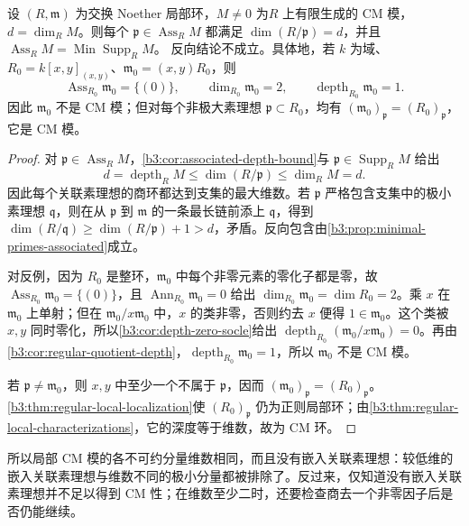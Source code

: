 \begin{proposition}\label{b3:prop:cm-associated-dimensions}
	设 \((R,\mathfrak m)\) 为交换 Noether 局部环，\(M\ne0\) 为\(R\) 上有限生成的 CM 模，\(d=\dim_RM\)。则每个 \(\mathfrak p\in\operatorname{Ass}_RM\) 都满足 \(\dim(R/\mathfrak p)=d\)，并且 \(\operatorname{Ass}_RM=\operatorname{Min}\operatorname{Supp}_RM\)。 反向结论不成立。具体地，若 \(k\) 为域、\(R_0=k[x,y]_{(x,y)}\)、\(\mathfrak m_0=(x,y)R_0\)，则
	\[
		\operatorname{Ass}_{R_0}\mathfrak m_0=\{(0)\},\qquad \dim_{R_0}\mathfrak m_0=2,\qquad \operatorname{depth}_{R_0}\mathfrak m_0=1.
	\]
	因此 \(\mathfrak m_0\) 不是 CM 模；但对每个非极大素理想 \(\mathfrak p\subset R_0\)，均有 \((\mathfrak m_0)_{\mathfrak p}=(R_0)_{\mathfrak p}\)，它是 CM 模。
\end{proposition}
\begin{proof}
	对 \(\mathfrak p\in\operatorname{Ass}_RM\)，\cref{b3:cor:associated-depth-bound}与 \(\mathfrak p\in\operatorname{Supp}_RM\) 给出
	\[
		d=\operatorname{depth}_RM\le\dim(R/\mathfrak p)\le\dim_RM=d.
	\]
	因此每个关联素理想的商环都达到支集的最大维数。若 \(\mathfrak p\) 严格包含支集中的极小素理想 \(\mathfrak q\)，则在从 \(\mathfrak p\) 到 \(\mathfrak m\) 的一条最长链前添上 \(\mathfrak q\)，得到 \(\dim(R/\mathfrak q)\ge\dim(R/\mathfrak p)+1>d\)，矛盾。反向包含由\cref{b3:prop:minimal-primes-associated}成立。

	对反例，因为 \(R_0\) 是整环，\(\mathfrak m_0\) 中每个非零元素的零化子都是零，故 \(\operatorname{Ass}_{R_0}\mathfrak m_0=\{(0)\}\)，且 \(\operatorname{Ann}_{R_0}\mathfrak m_0=0\) 给出 \(\dim_{R_0}\mathfrak m_0=\dim R_0=2\)。乘 \(x\) 在 \(\mathfrak m_0\) 上单射；但在 \(\mathfrak m_0/x\mathfrak m_0\) 中，\(x\) 的类非零，否则约去 \(x\) 便得 \(1\in\mathfrak m_0\)。这个类被 \(x,y\) 同时零化，所以\cref{b3:cor:depth-zero-socle}给出 \(\operatorname{depth}_{R_0}(\mathfrak m_0/x\mathfrak m_0)=0\)。再由\cref{b3:cor:regular-quotient-depth}，\(\operatorname{depth}_{R_0}\mathfrak m_0=1\)，所以 \(\mathfrak m_0\) 不是 CM 模。

	若 \(\mathfrak p\ne\mathfrak m_0\)，则 \(x,y\) 中至少一个不属于 \(\mathfrak p\)，因而 \((\mathfrak m_0)_{\mathfrak p}=(R_0)_{\mathfrak p}\)。\cref{b3:thm:regular-local-localization}使 \((R_0)_{\mathfrak p}\) 仍为正则局部环；由\cref{b3:thm:regular-local-characterizations}，它的深度等于维数，故为 CM 环。
\end{proof}

所以局部 CM 模的各不可约分量维数相同，而且没有嵌入关联素理想：较低维的嵌入关联素理想与维数不同的极小分量都被排除了。反过来，仅知道没有嵌入关联素理想并不足以得到 CM 性；在维数至少二时，还要检查商去一个非零因子后是否仍能继续。

